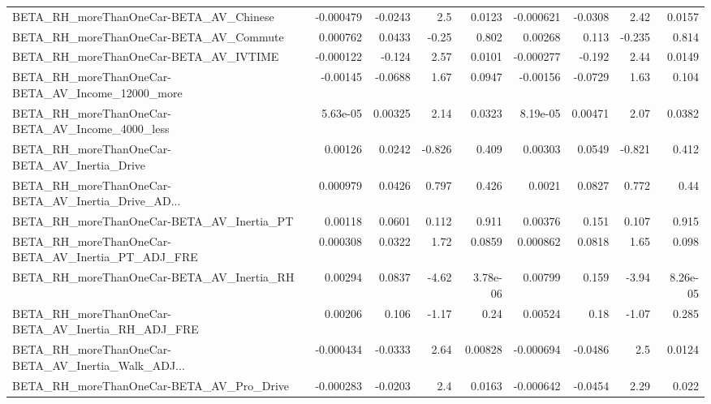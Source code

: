 \begin{tabular}{lrrrrrrrr}
BETA\_RH\_moreThanOneCar-BETA\_AV\_Chinese             &   -0.000479 &      -0.0243 &      2.5 &   0.0123 &  -0.000621 &     -0.0308 &         2.42 &        0.0157 \\
BETA\_RH\_moreThanOneCar-BETA\_AV\_Commute             &    0.000762 &       0.0433 &    -0.25 &    0.802 &    0.00268 &       0.113 &       -0.235 &         0.814 \\
BETA\_RH\_moreThanOneCar-BETA\_AV\_IVTIME              &   -0.000122 &       -0.124 &     2.57 &   0.0101 &  -0.000277 &      -0.192 &         2.44 &        0.0149 \\
BETA\_RH\_moreThanOneCar-BETA\_AV\_Income\_12000\_more   &    -0.00145 &      -0.0688 &     1.67 &   0.0947 &   -0.00156 &     -0.0729 &         1.63 &         0.104 \\
BETA\_RH\_moreThanOneCar-BETA\_AV\_Income\_4000\_less    &    5.63e-05 &      0.00325 &     2.14 &   0.0323 &   8.19e-05 &     0.00471 &         2.07 &        0.0382 \\
BETA\_RH\_moreThanOneCar-BETA\_AV\_Inertia\_Drive       &     0.00126 &       0.0242 &   -0.826 &    0.409 &    0.00303 &      0.0549 &       -0.821 &         0.412 \\
BETA\_RH\_moreThanOneCar-BETA\_AV\_Inertia\_Drive\_AD... &    0.000979 &       0.0426 &    0.797 &    0.426 &     0.0021 &      0.0827 &        0.772 &          0.44 \\
BETA\_RH\_moreThanOneCar-BETA\_AV\_Inertia\_PT          &     0.00118 &       0.0601 &    0.112 &    0.911 &    0.00376 &       0.151 &        0.107 &         0.915 \\
BETA\_RH\_moreThanOneCar-BETA\_AV\_Inertia\_PT\_ADJ\_FRE  &    0.000308 &       0.0322 &     1.72 &   0.0859 &   0.000862 &      0.0818 &         1.65 &         0.098 \\
BETA\_RH\_moreThanOneCar-BETA\_AV\_Inertia\_RH          &     0.00294 &       0.0837 &    -4.62 & 3.78e-06 &    0.00799 &       0.159 &        -3.94 &      8.26e-05 \\
BETA\_RH\_moreThanOneCar-BETA\_AV\_Inertia\_RH\_ADJ\_FRE  &     0.00206 &        0.106 &    -1.17 &     0.24 &    0.00524 &        0.18 &        -1.07 &         0.285 \\
BETA\_RH\_moreThanOneCar-BETA\_AV\_Inertia\_Walk\_ADJ... &   -0.000434 &      -0.0333 &     2.64 &  0.00828 &  -0.000694 &     -0.0486 &          2.5 &        0.0124 \\
BETA\_RH\_moreThanOneCar-BETA\_AV\_Pro\_Drive           &   -0.000283 &      -0.0203 &      2.4 &   0.0163 &  -0.000642 &     -0.0454 &         2.29 &         0.022 \\

\end{tabular}
